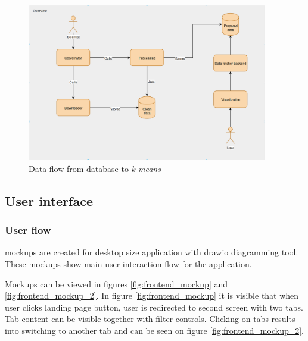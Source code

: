 \documentclass[a4paper,12pt]{article}
\begin{document}
	\begin{figure}[H]	
		\centering
		\includegraphics[width=10.5cm]{images/data_flow_overview.png}
		\caption{Data flow from database to \textit{k-means}}
		\label{fig:data_flow_pipeline}
	\end{figure}
	
	\vspace{1cm}
	
	\clearpage
	
	\subsection{User interface}
	
	\subsubsection{User flow}
	
	\glspl{mockup} are created for desktop size application with \gls{drawio} diagramming tool. These mockups show main user interaction flow for the application.
	
	Mockups can be viewed in figures \ref{fig:frontend_mockup} and \ref{fig:frontend_mockup_2}. In figure \ref{fig:frontend_mockup} it is visible that  when user clicks landing page button, user is redirected to second screen with two tabs. Tab content can be visible together with filter controls. Clicking on tabs results into switching to another tab and can be seen on figure \ref{fig:frontend_mockup_2}.
	
\end{document}
